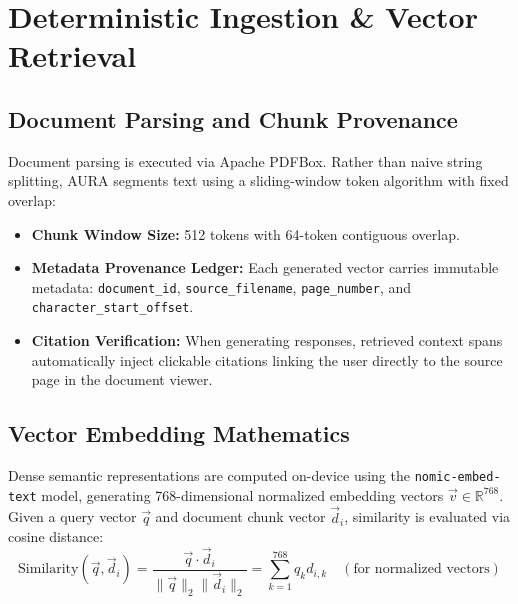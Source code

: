 \documentclass[12pt,a4paper]{report}
\begin{document}
\chapter{Deterministic Ingestion \& Vector Retrieval}

\section{Document Parsing and Chunk Provenance}
Document parsing is executed via Apache PDFBox. Rather than naive string splitting, AURA segments text using a sliding-window token algorithm with fixed overlap:
\begin{itemize}[nosep]
    \item \textbf{Chunk Window Size:} 512 tokens with 64-token contiguous overlap.
    \item \textbf{Metadata Provenance Ledger:} Each generated vector carries immutable metadata: \texttt{document\_id}, \texttt{source\_filename}, \texttt{page\_number}, and \texttt{character\_start\_offset}.
    \item \textbf{Citation Verification:} When generating responses, retrieved context spans automatically inject clickable citations linking the user directly to the source page in the document viewer.
\end{itemize}

\section{Vector Embedding Mathematics}
Dense semantic representations are computed on-device using the \texttt{nomic-embed-text} model, generating 768-dimensional normalized embedding vectors $\vec{v} \in \mathbb{R}^{768}$. Given a query vector $\vec{q}$ and document chunk vector $\vec{d}_i$, similarity is evaluated via cosine distance:
\begin{equation}
\text{Similarity}(\vec{q}, \vec{d}_i) = \frac{\vec{q} \cdot \vec{d}_i}{\|\vec{q}\|_2 \|\vec{d}_i\|_2} = \sum_{k=1}^{768} q_k d_{i,k} \quad (\text{for normalized vectors})
\end{equation}

\end{document}
